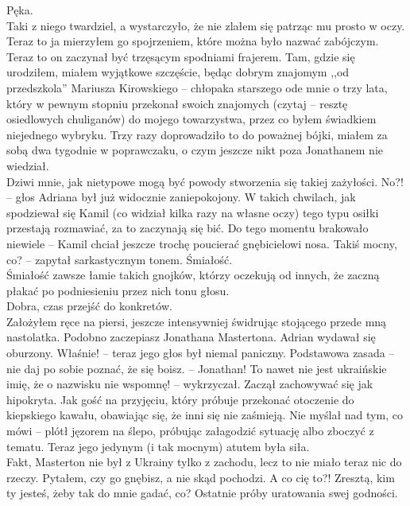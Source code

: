 \documentclass[../MAIN.tex]{subfiles}
\begin{document}
Pęka.\\
Taki z niego twardziel, a wystarczyło, że nie zlałem się patrząc mu prosto w oczy.\\
Teraz to ja mierzyłem go spojrzeniem, które można było nazwać zabójczym. Teraz to on zaczynał być trzęsącym spodniami frajerem. Tam, gdzie się urodziłem, miałem wyjątkowe szczęście, będąc dobrym znajomym ,,od przedszkola'' Mariusza Kirowskiego -- chłopaka starszego ode mnie o trzy lata, który w pewnym stopniu przekonał swoich znajomych (czytaj -- resztę osiedlowych chuliganów) do mojego towarzystwa, przez co byłem świadkiem niejednego wybryku. Trzy razy doprowadziło to do poważnej bójki, miałem za sobą dwa tygodnie w poprawczaku, o czym jeszcze nikt poza Jonathanem nie wiedział.\\
Dziwi mnie, jak nietypowe mogą być powody stworzenia się takiej zażyłości.
\sx No?! -- głos Adriana był już widocznie zaniepokojony. 
\qd
W takich chwilach, jak spodziewał się Kamil (co widział kilka razy na własne oczy) tego typu osiłki przestają rozmawiać, za to zaczynają się bić. Do tego momentu brakowało niewiele -- Kamil chciał jeszcze trochę poucierać gnębicielowi nosa.
\sx Takiś mocny, co? -- zapytał sarkastycznym tonem.
\qd
Śmiałość.\\
Śmiałość zawsze łamie takich gnojków, którzy oczekują od innych, że zaczną płakać po podniesieniu przez nich tonu głosu.\\
Dobra, czas przejść do konkretów.\\
Założyłem ręce na piersi, jeszcze intensywniej świdrując stojącego przede mną nastolatka.
\sx Podobno zaczepiasz Jonathana Mastertona.
\qd
Adrian wydawał się oburzony.
\sx Właśnie! -- teraz jego głos był niemal paniczny. Podstawowa zasada -- nie daj po sobie poznać, że się boisz. -- Jonathan! To nawet nie jest ukraińskie imię, że o nazwisku nie wspomnę! -- wykrzyczał.
\qd
Zaczął zachowywać się jak hipokryta. Jak gość na przyjęciu, który próbuje przekonać otoczenie do kiepskiego kawału, obawiając się, że inni się nie zaśmieją. Nie myślał nad tym, co mówi -- plótł jęzorem na ślepo, próbując załagodzić sytuację albo zboczyć z tematu. Teraz jego jedynym (i tak mocnym) atutem była siła.\\
Fakt, Masterton nie był z Ukrainy tylko z zachodu, lecz to nie miało teraz nic do rzeczy.
\sx Pytałem, czy go gnębisz, a nie skąd pochodzi.
\xx A co cię to?! Zresztą, kim ty jesteś, żeby tak do mnie gadać, co?
\qd
Ostatnie próby uratowania swej godności.
\end{document}
